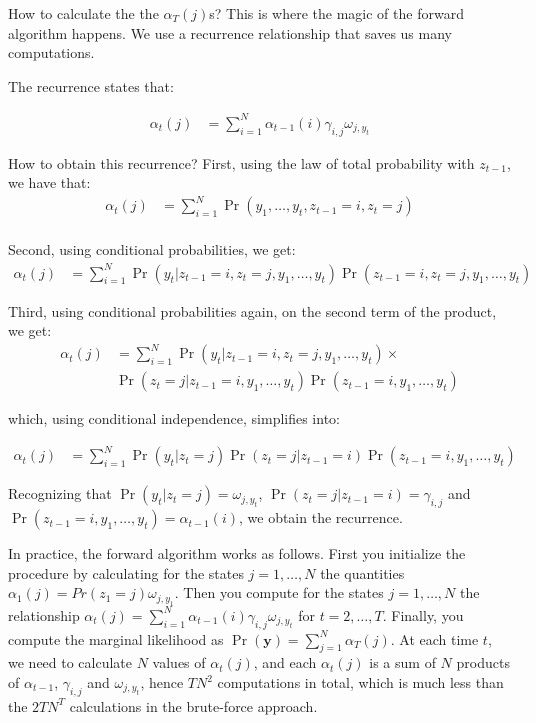 \documentclass[
  12pt,
]{krantz}
\begin{document}
How to calculate the the \(\alpha_T(j)\)s? This is where the magic of the forward algorithm happens. We use a recurrence relationship that saves us many computations.

The recurrence states that:

\begin{align*}
\alpha_t(j) &= \sum_{i=1}^N \alpha_{t-1}(i) \gamma_{i,j} \omega_{j,y_t}
\end{align*}

How to obtain this recurrence? First, using the law of total probability with \(z_{t-1}\), we have that:
\begin{align*}
\alpha_t(j) &= \sum_{i=1}^N \Pr(y_1, \ldots, y_t, z_{t-1} = i, z_t = j)\\
\end{align*}

Second, using conditional probabilities, we get:
\begin{align*}
\alpha_t(j) &= \sum_{i=1}^N \Pr(y_t | z_{t-1} = i, z_t = j, y_1, \ldots, y_t) \Pr(z_{t-1} = i, z_t = j, y_1, \ldots, y_t)
\end{align*}

Third, using conditional probabilities again, on the second term of the product, we get:
\begin{align*}
\alpha_t(j) &= \sum_{i=1}^N \Pr(y_t | z_{t-1} = i, z_t = j, y_1, \ldots, y_t) \times \\ & \Pr(z_t = j | z_{t-1} = i, y_1, \ldots, y_t) \Pr(z_{t-1} = i, y_1, \ldots, y_t)
\end{align*}

which, using conditional independence, simplifies into:

\begin{align*}
\alpha_t(j) &= \sum_{i=1}^N \Pr(y_t | z_t = j) \Pr(z_t = j | z_{t-1} = i) \Pr(z_{t-1} = i, y_1, \ldots, y_t)
\end{align*}

Recognizing that \(\Pr(y_{t}|z_{t}=j)=\omega_{j,y_t}\), \(\Pr(z_{t} = j | z_{t-1} = i) = \gamma_{i,j}\) and \(\Pr(z_{t-1} = i, y_1, \ldots, y_t) = \alpha_{t-1}(i)\), we obtain the recurrence.

In practice, the forward algorithm works as follows. First you initialize the procedure by calculating for the states \(j=1,\ldots,N\) the quantities \(\alpha_1(j) = Pr(z_1 = j) \omega_{j,y_1}\). Then you compute for the states \(j=1,\ldots,N\) the relationship \(\alpha_t(j) = \displaystyle{\sum_{i=1}^N \alpha_{t-1}(i) \gamma_{i,j} \omega_{j,y_t}}\) for \(t = 2, \ldots, T\). Finally, you compute the marginal likelihood as \(\Pr(\mathbf{y}) = \displaystyle{\sum_{j=1}^N\alpha_T(j)}\). At each time \(t\), we need to calculate \(N\) values of \(\alpha_t(j)\), and each \(\alpha_t(j)\) is a sum of \(N\) products of \(\alpha_{t-1}\), \(\gamma_{i,j}\) and \(\omega_{j,y_t}\), hence \(TN^2\) computations in total, which is much less than the \(2TN^T\) calculations in the brute-force approach.
\end{document}
